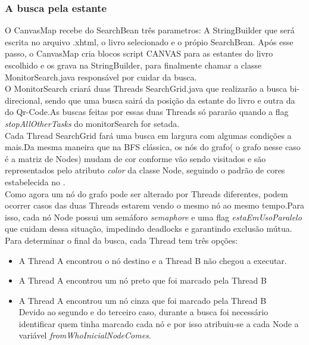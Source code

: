 \documentclass[a4paper,10pt]{article}
\begin{document}
	\subsubsection{A busca pela estante}

	O CanvasMap recebe do SearchBean três parametros: A StringBuilder que será escrita no arquivo .xhtml, o livro selecionado e o própio SearchBean.
	Após esse passo, o CanvasMap cria blocos script CANVAS para as estantes do livro escolhido e os grava na StringBuilder, para
	finalmente chamar a classe MonitorSearch.java responsável por cuidar da busca.\\

	O MonitorSearch criará duas Threads SearchGrid.java que realizarão a busca bi-direcional, sendo que uma busca sairá da posição da estante
	do livro e outra da do Qr-Code.As buscas feitas por essas duas Threads só pararão quando a flag {\it stopAllOtherTasks} do
	 monitorSearch for setada.\\

	Cada Thread SearchGrid fará uma busca em largura com algumas condições a mais.Da mesma maneira que na BFS clássica, os
	nós do grafo( o grafo nesse caso é a matriz de Nodes) mudam de cor conforme vão sendo visitados e são representados pelo atributo
	{\it color} da classe Node, seguindo o padrão de cores estabelecida no 	\cite{bidirecional}.\\

	Como agora um nó do grafo pode ser alterado por Threads diferentes, podem ocorrer casos das duas Threads estarem vendo o mesmo nó
	ao mesmo tempo.Para isso, cada nó Node possui um semáforo  {\it semaphore} e uma flag {\it estaEmUsoParalelo} que cuidam dessa situação,
	impedindo deadlocks e garantindo exclusão mútua.\\

	Para determinar o final da busca, cada Thread tem três opções:

	\begin{itemize}	
		\item{ A Thread A encontrou o nó destino e a Thread B não chegou a executar.}
		\item{ A Thread A encontrou um nó preto que foi marcado pela Thread B }
		\item{ A Thread A encontrou um nó cinza que foi marcado pela Thread B }\\

			Devido ao segundo e do terceiro caso, durante a busca foi necessário identificar quem tinha marcado cada nó e 
	por isso atribuiu-se a cada Node a variável {\it fromWhoInicialNodeComes}.

	
	\end{itemize}
	
\end{document}
